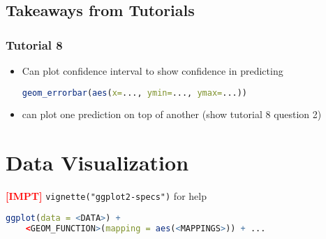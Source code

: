 \documentclass{article}
\newcommand{\impt}[0]{\textcolor{red}{\textbf{[IMPT] }}}
\begin{document}
\begin{multicols}{2}
\subsection{Takeaways from Tutorials}
\subsubsection{Tutorial 8}
\begin{itemize}
	\item Can plot confidence interval to show confidence in predicting
	\begin{lstlisting}[language=R]
geom_errorbar(aes(x=..., ymin=..., ymax=...))
	\end{lstlisting}
	\item can plot one prediction on top of another (show tutorial 8 question 2)
\end{itemize}



\section{Data Visualization}

\impt \texttt{vignette("ggplot2-specs")} for help
\begin{lstlisting}[language=R]
ggplot(data = <DATA>) +
    <GEOM_FUNCTION>(mapping = aes(<MAPPINGS>)) + ...
\end{lstlisting}


\end{multicols}
\end{document}
